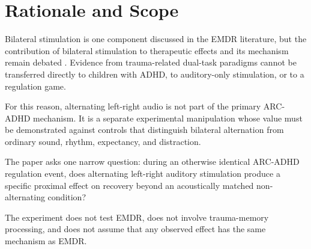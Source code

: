 \section{Rationale and Scope}

Bilateral stimulation is one component discussed in the EMDR literature, but the contribution of bilateral stimulation to therapeutic effects and its mechanism remain debated \parencite{landinromero2018emdr,wadji2022workingmemory}. Evidence from trauma-related dual-task paradigms cannot be transferred directly to children with ADHD, to auditory-only stimulation, or to a regulation game.

For this reason, alternating left-right audio is not part of the primary ARC-ADHD mechanism. It is a separate experimental manipulation whose value must be demonstrated against controls that distinguish bilateral alternation from ordinary sound, rhythm, expectancy, and distraction.

The paper asks one narrow question: during an otherwise identical ARC-ADHD regulation event, does alternating left-right auditory stimulation produce a specific proximal effect on recovery beyond an acoustically matched non-alternating condition?

The experiment does not test EMDR, does not involve trauma-memory processing, and does not assume that any observed effect has the same mechanism as EMDR.
